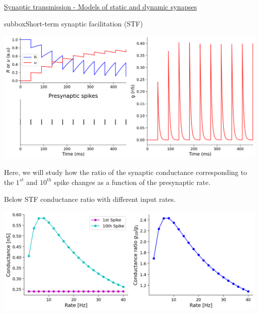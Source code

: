 \begin{textbox}{\href{https://compneuro.neuromatch.io/tutorials/W2D3_BiologicalNeuronModels/student/W2D3_Tutorial3.html}{Synaptic transmission - Models of static and dynamic synapses } }
\begin{subbox}{subbox}{Short-term synaptic facilitation (STF)}
\begin{center}
    
\includegraphics[scale=0.14]{Figures/BNM/LIF_Figure12.png}
\end{center}

Here, we will study how the ratio of the synaptic conductance corresponding to the $1^{st}$ and $10^{th}$ spike changes as a function of the presynaptic rate. 

Below STF conductance ratio with different input rates.
\begin{center}
    
\includegraphics[scale=0.14]{Figures/BNM/LIF_Figure13.png}
\end{center}

\end{subbox}

\end{textbox}
